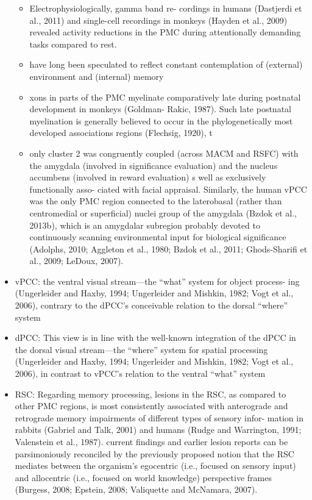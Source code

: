 \documentclass{article} %
\begin{document}
\begin{itemize}
\begin{itemize}
  \item
Electrophysiologically, gamma band re- cordings in humans (Dastjerdi et al., 2011) and single-cell recordings in monkeys (Hayden et al., 2009) revealed activity reductions in the PMC during attentionally demanding tasks compared to rest.

\item
 have long been speculated to reflect constant contemplation of (external) environment and (internal) memory

 \item
   xons in parts of the PMC myelinate comparatively late during postnatal development in monkeys (Goldman- Rakic, 1987). Such late postnatal myelination is generally believed to occur in the phylogenetically most developed associations regions (Flechsig, 1920), t

\item
only cluster 2 was congruently coupled (across MACM and RSFC) with the amygdala (involved in significance evaluation) and the nucleus accumbens (involved in reward evaluation)
s well as exclusively functionally asso- ciated with facial appraisal. Similarly, the human vPCC was the only PMC region connected to the laterobasal (rather than centromedial or superficial) nuclei group of the amygdala (Bzdok et al., 2013b), which is an amygdalar subregion probably devoted to continuously scanning environmental input for biological significance (Adolphs, 2010; Aggleton et al., 1980; Bzdok et al., 2011; Ghods-Sharifi et al., 2009; LeDoux, 2007).
\end{itemize}

  \item
    vPCC:
the ventral visual stream—the “what” system for object process- ing (Ungerleider and Haxby, 1994; Ungerleider and Mishkin, 1982; Vogt et al., 2006), contrary to the dPCC's conceivable relation to the dorsal “where” system
\item
  dPCC:
This view is in line with the well-known integration of the dPCC in the dorsal visual stream—the “where” system for spatial processing (Ungerleider and Haxby, 1994; Ungerleider and Mishkin, 1982; Vogt et al., 2006), in contrast to vPCC's relation to the ventral “what” system

\item
RSC:
Regarding memory processing, lesions in the RSC, as compared to other PMC regions, is most consistently associated with anterograde and retrograde memory impairments of different types of sensory infor- mation in rabbits (Gabriel and Talk, 2001) and humans (Rudge and Warrington, 1991; Valenstein et al., 1987).
current findings and earlier lesion reports can be parsimoniously reconciled by the previously proposed notion that the RSC mediates between the organism's egocentric (i.e., focused on sensory input) and allocentric (i.e., focused on world knowledge) perspective frames (Burgess, 2008; Epstein, 2008; Valiquette and McNamara, 2007).


\end{itemize}
\end{document}
